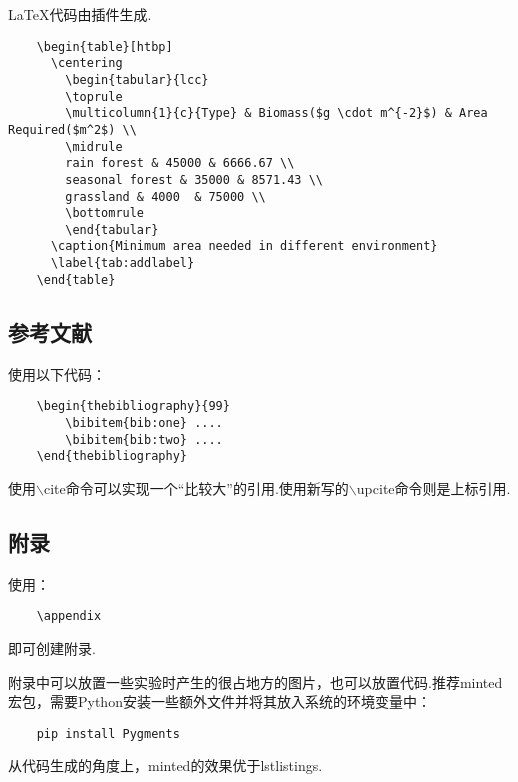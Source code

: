 \documentclass[bwprint, withouttitlepage]{mathexpthesis}
\begin{document}
\LaTeX 代码由插件生成.
\begin{verbatim}
    \begin{table}[htbp]
      \centering
        \begin{tabular}{lcc}
        \toprule
        \multicolumn{1}{c}{Type} & Biomass($g \cdot m^{-2}$) & Area Required($m^2$) \\
        \midrule
        rain forest & 45000 & 6666.67 \\
        seasonal forest & 35000 & 8571.43 \\
        grassland & 4000  & 75000 \\
        \bottomrule
        \end{tabular}
      \caption{Minimum area needed in different environment}
      \label{tab:addlabel}
    \end{table}
\end{verbatim}

\subsection{参考文献}
使用以下代码：
\begin{verbatim}
    \begin{thebibliography}{99}
        \bibitem{bib:one} ....
        \bibitem{bib:two} ....
    \end{thebibliography}
\end{verbatim}

使用$\backslash$cite命令可以实现一个“比较大”的引用\cite{bib:one}.使用新写的$\backslash$upcite命令则是上标引用.

\subsection{附录}
使用：
\begin{verbatim}
    \appendix
\end{verbatim}

即可创建附录.

附录中可以放置一些实验时产生的很占地方的图片，也可以放置代码.推荐minted宏包，需要Python安装一些额外文件并将其放入系统的环境变量中：
\begin{verbatim}
    pip install Pygments
\end{verbatim}

从代码生成的角度上，minted的效果优于lstlistings.
\end{document}
